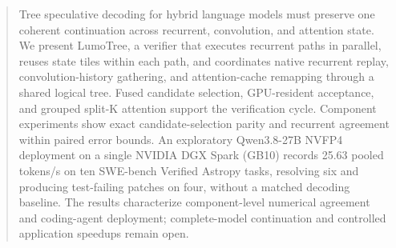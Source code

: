 \begin{abstract}
Tree speculative decoding for hybrid language models must preserve one coherent continuation across recurrent, convolution, and attention state. We present LumoTree, a verifier that executes recurrent paths in parallel, reuses state tiles within each path, and coordinates native recurrent replay, convolution-history gathering, and attention-cache remapping through a shared logical tree. Fused candidate selection, GPU-resident acceptance, and grouped split-K attention support the verification cycle. Component experiments show exact candidate-selection parity and recurrent agreement within paired error bounds. An exploratory Qwen3.8-27B NVFP4 deployment on a single NVIDIA DGX Spark (GB10) records 25.63 pooled tokens/s on ten SWE-bench Verified Astropy tasks, resolving six and producing test-failing patches on four, without a matched decoding baseline. The results characterize component-level numerical agreement and coding-agent deployment; complete-model continuation and controlled application speedups remain open.
\end{abstract}
